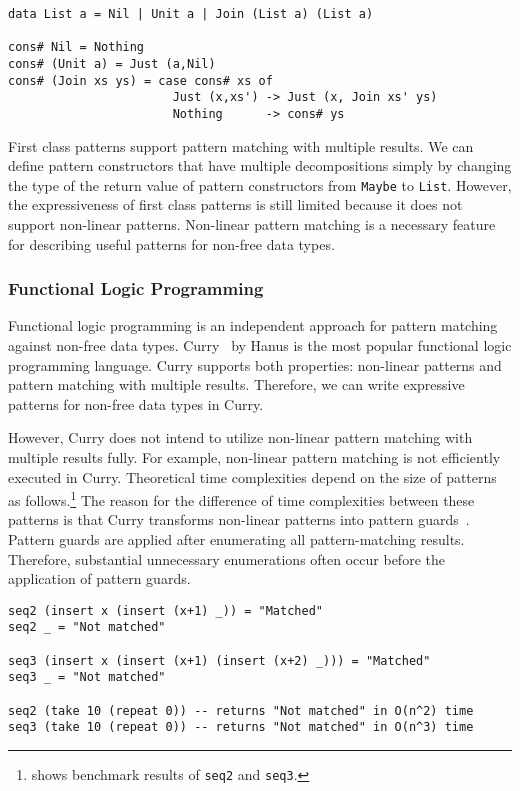 \documentclass{article}
\begin{document}
\begin{lstlisting}[language=egison]
data List a = Nil | Unit a | Join (List a) (List a)

cons# Nil = Nothing
cons# (Unit a) = Just (a,Nil)
cons# (Join xs ys) = case cons# xs of
                       Just (x,xs') -> Just (x, Join xs' ys)
                       Nothing      -> cons# ys
\end{lstlisting}

First class patterns support pattern matching with multiple results.
We can define pattern constructors that have multiple decompositions simply by changing the type of the return value of pattern constructors from \texttt{Maybe} to \texttt{List}.
However, the expressiveness of first class patterns is still limited because it does not support non-linear patterns.
Non-linear pattern matching is a necessary feature for describing useful patterns for non-free data types.

\subsubsection{Functional Logic Programming}\label{curry}

Functional logic programming is an independent approach for pattern matching against non-free data types.
Curry~\cite{hanus1995curry} by Hanus is the most popular functional logic programming language.
Curry supports both properties: non-linear patterns and pattern matching with multiple results.
Therefore, we can write expressive patterns for non-free data types in Curry.

However, Curry does not intend to utilize non-linear pattern matching with multiple results fully.
For example, non-linear pattern matching is not efficiently executed in Curry.
Theoretical time complexities depend on the size of patterns as follows.\footnote{\cite{egi2018Aplas} shows benchmark results of \texttt{seq2} and \texttt{seq3}.}
The reason for the difference of time complexities between these patterns is that Curry transforms non-linear patterns into pattern guards~\cite{antoy2010programming,antoy2001constructor,hanus2007multi}.
Pattern guards are applied after enumerating all pattern-matching results.
Therefore, substantial unnecessary enumerations often occur before the application of pattern guards.

\begin{lstlisting}[language=egison]
seq2 (insert x (insert (x+1) _)) = "Matched"
seq2 _ = "Not matched"

seq3 (insert x (insert (x+1) (insert (x+2) _))) = "Matched"
seq3 _ = "Not matched"

seq2 (take 10 (repeat 0)) -- returns "Not matched" in O(n^2) time
seq3 (take 10 (repeat 0)) -- returns "Not matched" in O(n^3) time
\end{lstlisting}
\end{document}

